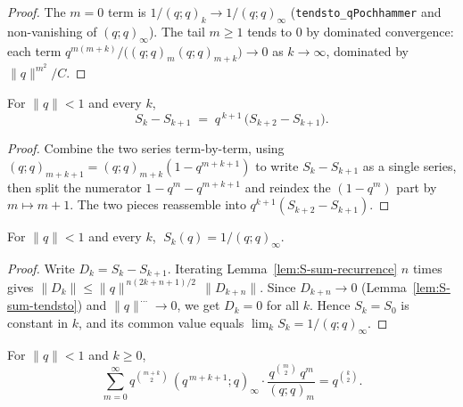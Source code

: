 \begin{proof}\leanok
The $m = 0$ term is $1/(q;q)_k \to 1/(q;q)_\infty$
(\texttt{tendsto\_qPochhammer} and non-vanishing of $(q;q)_\infty$). The tail
$m \ge 1$ tends to $0$ by dominated convergence: each term
$q^{m(m+k)}/\bigl((q;q)_m(q;q)_{m+k}\bigr) \to 0$ as $k \to \infty$, dominated
by $\|q\|^{m^2}/C$.
\end{proof}

\begin{lemma}\label{lem:S-sum-recurrence}\leanok{}
For $\|q\| < 1$ and every $k$,
\[
  S_k - S_{k+1} \;=\; q^{\,k+1}\,\bigl(S_{k+2} - S_{k+1}\bigr).
\]
\end{lemma}

\begin{proof}\leanok
Combine the two series term-by-term, using $(q;q)_{m+k+1} = (q;q)_{m+k}(1 - q^{m+k+1})$
to write $S_k - S_{k+1}$ as a single series, then split the numerator
$1 - q^m - q^{m+k+1}$ and reindex the $(1 - q^m)$ part by $m \mapsto m+1$. The
two pieces reassemble into $q^{k+1}(S_{k+2} - S_{k+1})$.
\end{proof}

\begin{theorem}\label{thm:S-sum-eq}\leanok{}
For $\|q\| < 1$ and every $k$, $\;S_k(q) = 1/(q;q)_\infty$.
\end{theorem}

\begin{proof}\leanok{}
Write $D_k = S_k - S_{k+1}$. Iterating Lemma~\ref{lem:S-sum-recurrence}
$n$ times gives $\|D_k\| \le \|q\|^{\,n(2k+n+1)/2}\,\|D_{k+n}\|$. Since
$D_{k+n} \to 0$ (Lemma~\ref{lem:S-sum-tendsto}) and $\|q\|^{\,\cdots} \to 0$,
we get $D_k = 0$ for all $k$. Hence $S_k = S_0$ is constant in $k$, and its
common value equals $\lim_{k} S_k = 1/(q;q)_\infty$.
\end{proof}

\begin{lemma}\label{lem:cauchy-coeff-nonneg}\leanok{}
For $\|q\| < 1$ and $k \ge 0$,
\[
  \sum_{m=0}^{\infty}
    q^{\binom{m+k}{2}}\,(q^{\,m+k+1};q)_\infty \cdot
    \frac{q^{\binom{m}{2}}\, q^{m}}{(q;q)_m} = q^{\binom{k}{2}}.
\]
\end{lemma}

